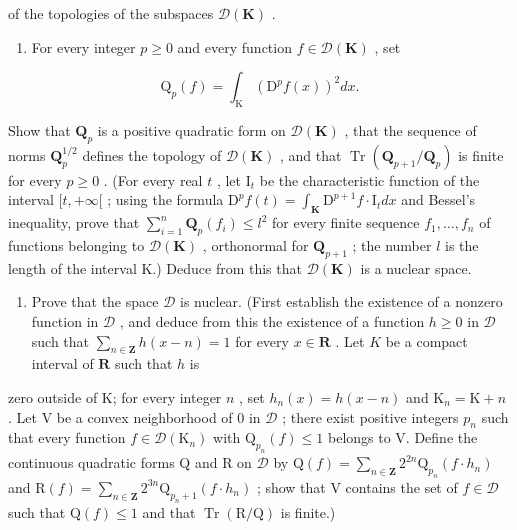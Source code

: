 of the topologies of the subspaces \(\mathcal{D}(\mathbf{K})\) .

\begin{enumerate}
\def\labelenumi{\alph{enumi})}
\tightlist
\item
  For every integer \(p \geqslant 0\) and every function \(f \in \mathcal{D}(\mathbf{K})\) , set
\end{enumerate}

\[
\mathrm{Q} _ {p} (f) = \int_ {\mathrm{K}} \left(\mathrm{D} ^ {p} f (x)\right) ^ {2} d x.
\]

Show that \(\mathbf{Q}_p\) is a positive quadratic form on \(\mathcal{D}(\mathbf{K})\) , that the sequence of norms \(\mathbf{Q}_p^{1/2}\) defines the topology of \(\mathcal{D}(\mathbf{K})\) , and that \(\operatorname{Tr}(\mathbf{Q}_{p+1}/\mathbf{Q}_p)\) is finite for every \(p \geqslant 0\) . (For every real \(t\) , let \(\mathrm{I}_t\) be the characteristic function of the interval \([t, +\infty[\) ; using the formula \(\mathrm{D}^p f(t) = \int_{\mathbf{K}} \mathrm{D}^{p+1} f \cdot \mathrm{I}_t dx\) and Bessel's inequality, prove that \(\sum_{i=1}^{n} \mathbf{Q}_p(f_i) \leqslant l^2\) for every finite sequence \(f_1, \ldots, f_n\) of functions belonging to \(\mathcal{D}(\mathbf{K})\) , orthonormal for \(\mathbf{Q}_{p+1}\) ; the number \(l\) is the length of the interval K.) Deduce from this that \(\mathcal{D}(\mathbf{K})\) is a nuclear space.

\begin{enumerate}
\def\labelenumi{\alph{enumi})}
\setcounter{enumi}{1}
\tightlist
\item
  Prove that the space \(\mathcal{D}\) is nuclear. (First establish the existence of a nonzero function in \(\mathcal{D}\) , and deduce from this the existence of a function \(h \geqslant 0\) in \(\mathcal{D}\) such that \(\sum_{n \in \mathbf{Z}} h(x - n) = 1\) for every \(x \in \mathbf{R}\) . Let \(K\) be a compact interval of \(\mathbf{R}\) such that \(h\) is
\end{enumerate}

zero outside of K; for every integer \(n\) , set \(h_n(x) = h(x - n)\) and \(\mathrm{K}_n = \mathrm{K} + n\) . Let V be a convex neighborhood of 0 in \(\mathcal{D}\) ; there exist positive integers \(p_n\) such that every function \(f \in \mathcal{D}(\mathrm{K}_n)\) with \(\mathrm{Q}_{p_n}(f) \leqslant 1\) belongs to V. Define the continuous quadratic forms Q and R on \(\mathcal{D}\) by \(\mathrm{Q}(f) = \sum_{n \in \mathbf{Z}} 2^{2n} \mathrm{Q}_{p_n}(f \cdot h_n)\) and \(\mathrm{R}(f) = \sum_{n \in \mathbf{Z}} 2^{3n} \mathrm{Q}_{p_n + 1}(f \cdot h_n)\) ; show that V contains the set of \(f \in \mathcal{D}\) such that \(\mathrm{Q}(f) \leqslant 1\) and that \(\operatorname{Tr}(\mathrm{R}/\mathrm{Q})\) is finite.)

